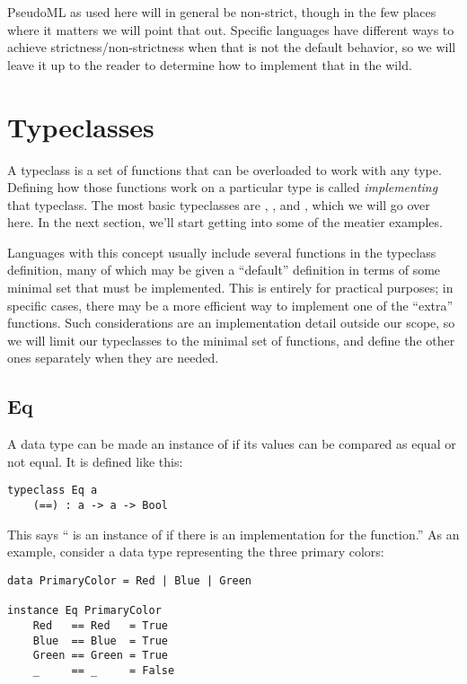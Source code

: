 PseudoML as used here will in general be non-strict, though in the few places where it matters we will point that out. Specific languages have different ways to achieve strictness/non-strictness when that is not the default behavior, so we will leave it up to the reader to determine how to implement that in the wild.

\section{Typeclasses}

A typeclass is a set of functions that can be overloaded to work with any type. Defining how those functions work on a particular type is called \emph{implementing} that typeclass. The most basic typeclasses are , , and , which we will go over here. In the next section, we'll start getting into some of the meatier examples.

Languages with this concept usually include several functions in the typeclass definition, many of which may be given a ``default'' definition in terms of some minimal set that must be implemented. This is entirely for practical purposes; in specific cases, there may be a more efficient way to implement one of the ``extra'' functions. Such considerations are an implementation detail outside our scope, so we will limit our typeclasses to the minimal set of functions, and define the other ones separately when they are needed.

\subsection{Eq}

A data type can be made an instance of  if its values can be compared as equal or not equal. It is defined like this:

\begin{lstlisting}[language=pseudoml]
typeclass Eq a
    (==) : a -> a -> Bool
\end{lstlisting}

This says `` is an instance of  if there is an implementation for the \mlil{(==)} function.'' As an example, consider a data type representing the three primary colors:

\begin{lstlisting}[language=pseudoml]
data PrimaryColor = Red | Blue | Green

instance Eq PrimaryColor
    Red   == Red   = True
    Blue  == Blue  = True
    Green == Green = True
    _     == _     = False
\end{lstlisting}

